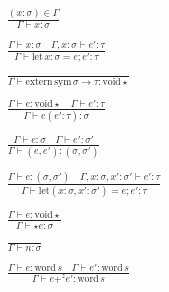\documentclass {article}
\begin{document}
\begin{gather*}
\frac
{(x : \sigma) \in \Gamma}
{\Gamma \vdash x : \sigma} \\
\\
\frac
{\Gamma \vdash x : \sigma \quad \Gamma, x : \sigma \vdash e' : \tau }
{\Gamma \vdash \text{let} \, x : \sigma = e; e' : \tau} \\
\\
\frac
{}
{\Gamma \vdash \text{extern} \, \text{sym} \, \sigma \to \tau : \text{void} \star} \\
\\
\frac
{\Gamma \vdash e : \text{void} \star \quad \Gamma \vdash e' : \tau}
{\Gamma \vdash e(e' : \tau) : \sigma} \\
\\
\frac
{\Gamma \vdash e : \sigma \quad \Gamma \vdash e' : \sigma'}
{\Gamma \vdash (e, e') : (\sigma, \sigma') } \\
\\
\frac
{\Gamma \vdash e : (\sigma, \sigma') \quad \Gamma, x : \sigma, x' : \sigma' \vdash e' : \tau}
{\Gamma \vdash \text{let} (x: \sigma, x' : \sigma') = e; e' : \tau} \\
\\
\frac
{\Gamma \vdash e : \text{void} \star}
{\Gamma \vdash \star e : \sigma} \\
\\
\frac
{}
{\Gamma \vdash n : \sigma} \\
\\
\frac
{\Gamma \vdash e : \text{word} \, s \quad \Gamma \vdash e' : \text{word} \, s }
{\Gamma \vdash e +^z e' : \text{word} \, s}
\end{gather*}
\end{document}
